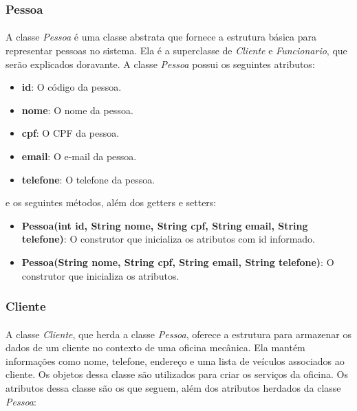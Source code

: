 \documentclass[a4paper,12pt]{article}
\begin{document}
\subsubsection{Pessoa}
\paragraph{}
A classe \textit{Pessoa} é uma classe abstrata que fornece a estrutura básica para representar pessoas no sistema. Ela é a superclasse de \textit{Cliente} e \textit{Funcionario}, que serão explicados doravante. A classe \textit{Pessoa} possui os seguintes atributos:

\begin{itemize}[noitemsep]
    \item \textbf{id}: O código da pessoa.
    \item \textbf{nome}: O nome da pessoa.
    \item \textbf{cpf}: O CPF da pessoa.
    \item \textbf{email}: O e-mail da pessoa.
    \item \textbf{telefone}: O telefone da pessoa.
\end{itemize}

\noindent e os seguintes métodos, além dos getters e setters:

\begin{itemize}[noitemsep]
    \item \textbf{Pessoa(int id, String nome, String cpf, String email, String telefone)}: O construtor que inicializa os atributos com id informado.
    \item \textbf{Pessoa(String nome, String cpf, String email, String telefone)}: O construtor que inicializa os atributos.
\end{itemize}

\subsubsection{Cliente}
\paragraph{}
A classe \textit{Cliente}, que herda a classe \textit{Pessoa}, oferece a estrutura para armazenar os dados de um cliente no contexto de uma oficina mecânica. Ela mantém informações como nome, telefone, endereço e uma lista de veículos associados ao cliente. Os objetos dessa classe são utilizados para criar os serviços da oficina. Os atributos dessa classe são os que seguem, além dos atributos herdados da classe \textit{Pessoa}:
\end{document}
